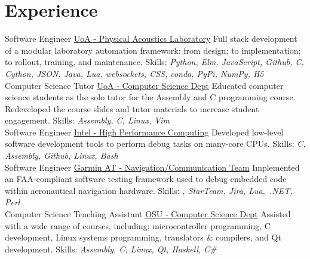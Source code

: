 \documentclass[a4paper]{twentysecondcv}
\begin{document}
\makeprofile{}

\section{Experience}
\begin{twenty}
           {}
           {Software Engineer}
           {\href{https://pal.auckland.ac.nz/}{UoA - Physical Acoustics Laboratory}}
           {}
           {Full stack development of a modular laboratory automation
           framework: from design; to implementation; to rollout, training, and
           maintenance.
           Skills: \emph{Python, Elm, JavaScript, Github, C, Cython, JSON,
           Java, Lua, websockets, CSS, conda, PyPi, NumPy, H5}} \\

           {}
           {Computer Science Tutor}
           {\href{http://www.auckland.ac.nz/}{UoA - Computer Science Dept}}
           {}
           {Educated computer science students as the solo tutor for the
           Assembly and C programming course. Redeveloped the course slides and
           tutor materials to increase student engagement.
           Skills: \emph{Assembly, C, Linux, Vim}} \\

           {}
           {Software Engineer}
           {\href{https://www.intel.com}{Intel - High Performance Computing}}
           {}
           {Developed low-level software development tools to perform debug
           tasks on many-core CPUs.
           Skills: \emph{C, Assembly, Github, Linux, Bash}} \\

           {}
           {Software Engineer}
           {\href{http://www.garmin.com}{Garmin AT - Navigation/Communication Team}}
           {}
           {Implemented an FAA-compliant software testing framework used to
           debug embedded code within aeronautical navigation hardware.
           Skills: \emph{\CC, StarTeam, Jira, Lua,~.NET, Perl}} \\

           {}
           {Computer Science Teaching Assistant}
           {\href{http://www.oregonstate.edu/}{OSU - Computer Science Dept}}
           {}
           {Assisted with a wide range of courses, including: microcontroller
           programming, C development, Linux systems programming, translators
           \& compilers, and Qt development.
           Skills: \emph{Assembly, C, Linux, Qt, Haskell, C\#}} \\


\end{twenty}
\end{document}
